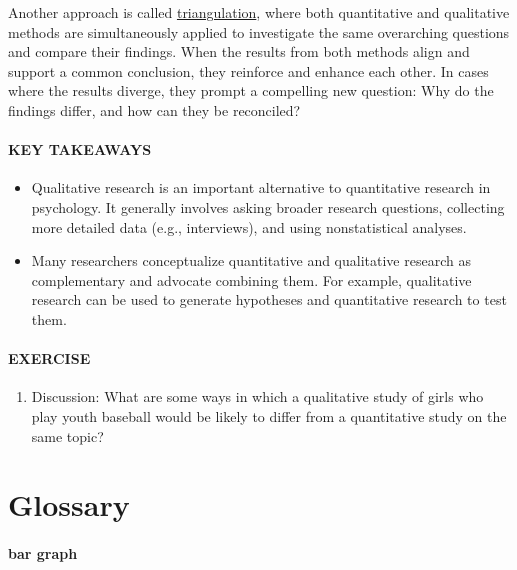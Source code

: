 \documentclass[
]{krantz}
\providecommand{\tightlist}{%
  \setlength{\itemsep}{0pt}\setlength{\parskip}{0pt}}
\begin{document}
Another approach is called \hyperref[triangulation]{triangulation}, where both quantitative and qualitative methods are simultaneously applied to investigate the same overarching questions and compare their findings. When the results from both methods align and support a common conclusion, they reinforce and enhance each other. In cases where the results diverge, they prompt a compelling new question: Why do the findings differ, and how can they be reconciled?

\paragraph*{KEY TAKEAWAYS}\label{key-takeaways-5}

\begin{itemize}
\tightlist
\item
  Qualitative research is an important alternative to quantitative research in psychology. It generally involves asking broader research questions, collecting more detailed data (e.g., interviews), and using nonstatistical analyses.
\item
  Many researchers conceptualize quantitative and qualitative research as complementary and advocate combining them. For example, qualitative research can be used to generate hypotheses and quantitative research to test them.
\end{itemize}

\paragraph*{EXERCISE}\label{exercise}

\begin{enumerate}
\def\labelenumi{\arabic{enumi}.}
\tightlist
\item
  Discussion: What are some ways in which a qualitative study of girls who play youth baseball would be likely to differ from a quantitative study on the same topic?
\end{enumerate}

\section{Glossary}\label{glossary-1}

\paragraph*{bar graph}\label{bar-graph}
\end{document}
